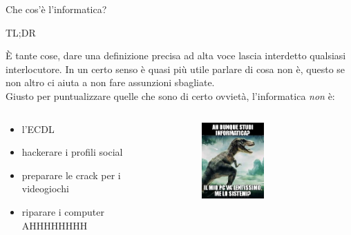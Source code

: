 \documentclass[aspectratio=1610]{beamer}
\begin{document}
	\begin{frame}[fragile]{Che cos'è l'informatica?}
		\pause
		\begin{center}
			\Large{TL;DR}\\
		\end{center}		
		È tante cose, dare una definizione precisa ad alta voce lascia interdetto qualsiasi interlocutore. In un certo senso è quasi più utile parlare di cosa \alert<1>{non} è, questo se non altro ci aiuta a non fare assunzioni sbagliate.\\
		\bigskip
		\pause
		Giusto per puntualizzare quelle che sono di certo ovvietà, l'informatica \emph{non} è:
		\begin{columns}
			\begin{column}{0.55\textwidth}
				\begin{itemize}
					\item l'ECDL 
					\item hackerare i profili social 
					\item preparare le crack per i videogiochi 
					\item riparare i computer \Large{AHHHHHHHH} 
				\end{itemize}		
			\end{column}
			 {
				\begin{column}{0.4\textwidth}
					\begin{figure}
						\includegraphics[width=0.5\textwidth, keepaspectratio]{memino.jpg}	
					\end{figure}
				\end{column}
			}
		\end{columns}
	\end{frame}
\end{document}
